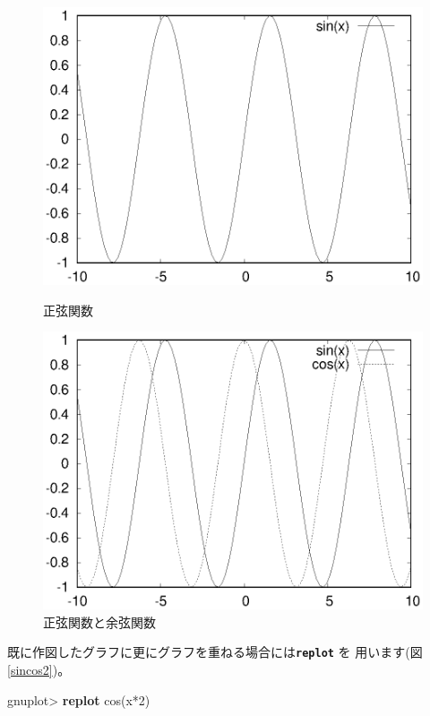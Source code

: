 \documentclass[a4j]{ujarticle} %
\newenvironment{terminal}{%
  \begin{center}
   \begin{minipage}{.8\textwidth}
    \setlength{\FrameSep}{.5\FrameSep}%
    \begin{framed}\ttfamily\small%
     \setlength\baselineskip{.85\baselineskip}%
}{%
    \end{framed}
   \end{minipage}
  \end{center}%
}
\begin{document}
\begin{figure}
\begin{minipage}[hbtp]{0.49\textwidth}
\includegraphics[width=\hsize]{sin.eps}
\caption{正弦関数}
\label{sin}
\end{minipage}
\begin{minipage}[hbtp]{0.49\textwidth}
\includegraphics[width=\hsize]{sincos.eps}
\caption{正弦関数と余弦関数}
\label{sincos}
\end{minipage}
\end{figure}

既に作図したグラフに更にグラフを重ねる場合には{\tt\bf replot} を
用います(図\ref{sincos2})。
\begin{terminal}
gnuplot> {\bf replot} cos(x*2)
\end{terminal}
\end{document}
